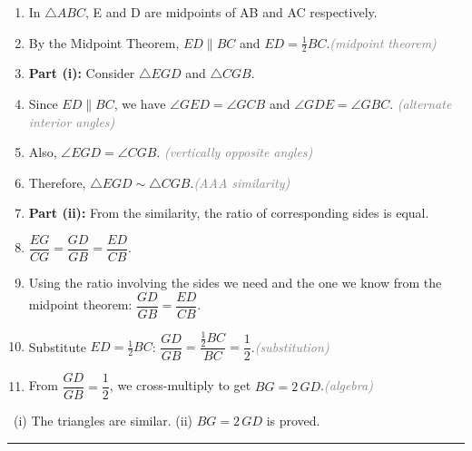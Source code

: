 \documentclass{article}
\newenvironment{steps}{%
  \begin{enumerate}[label=\textcolor{primary}{Step~\arabic*:}, leftmargin=*]
}{\end{enumerate}}
\newcommand{\dul}[1]{\uuline{#1}}
\newcommand{\reason}[1]{\hfill\textit{\textcolor{gray}{(#1)}}}
\newcommand{\solutionrule}{\par\noindent\color{accent}\rule{\linewidth}{0.6pt}\par\smallskip}
\newcommand{\finalanswer}[1]{\noindent\textbf{\textcolor{accent}{\dul{Answer:}}}~#1\solutionrule}
\begin{document}
\begin{center}
\end{center}

\begin{steps}
  \item In $\triangle ABC$, E and D are midpoints of AB and AC respectively.
  \item By the Midpoint Theorem, $ED \parallel BC$ and $ED=\tfrac12 BC$.\reason{midpoint theorem}
  \item \textbf{Part (i):} Consider $\triangle EGD$ and $\triangle CGB$.
  \item Since $ED \parallel BC$, we have $\angle GED = \angle GCB$ and $\angle GDE = \angle GBC$. \reason{alternate interior angles}
  \item Also, $\angle EGD = \angle CGB$. \reason{vertically opposite angles}
  \item Therefore, $\triangle EGD\sim\triangle CGB$.\reason{AAA similarity}
  \item \textbf{Part (ii):} From the similarity, the ratio of corresponding sides is equal.
  \item $\dfrac{EG}{CG}=\dfrac{GD}{GB}=\dfrac{ED}{CB}$.
  \item Using the ratio involving the sides we need and the one we know from the midpoint theorem: $\dfrac{GD}{GB}=\dfrac{ED}{CB}$.
  \item Substitute $ED=\tfrac12 BC$: $\dfrac{GD}{GB}=\dfrac{\tfrac12 BC}{BC} = \dfrac{1}{2}$.\reason{substitution}
  \item From $\dfrac{GD}{GB}=\dfrac{1}{2}$, we cross-multiply to get $BG=2\,GD$.\reason{algebra}
\end{steps}

\finalanswer{(i) The triangles are similar. (ii) $BG=2\,GD$ is proved.}

\newpage
\end{document}
